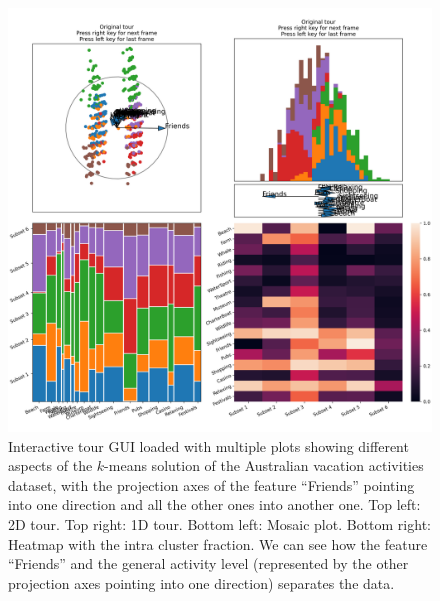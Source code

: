 \documentclass[article]{ajs}
\begin{document}
\begin{figure}[h!]
    \centering
    \includegraphics[width=1\textwidth]{aus_preselection.pdf}
    \caption{Interactive tour GUI loaded with multiple plots showing different aspects of the $k$-means solution of the Australian vacation activities dataset, with the projection axes of the feature ``Friends'' pointing into one direction and all the other ones into another one. Top left: 2D tour. Top right: 1D tour. Bottom left: Mosaic plot. Bottom right: Heatmap with the intra cluster fraction. We can see how the feature ``Friends'' and the general activity level (represented by the other projection axes pointing into one direction) separates the data.}
    \label{fig:aus_preselection}
\end{figure}
\end{document}
